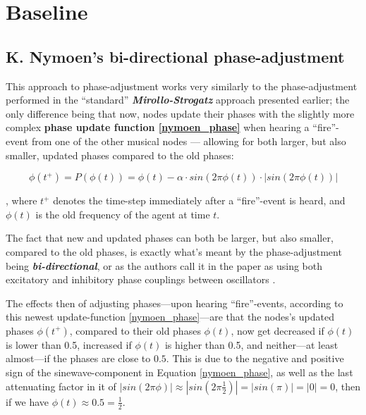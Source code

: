 \chapter{Baseline}
\label{chap:baseline}
	
\section{K. Nymoen's bi-directional phase-adjustment} %
\label{nymoen_phase_adjust}

This approach to phase-adjustment works very similarly to the phase-adjustment performed in the ``standard'' \textbf{\textit{Mirollo-Strogatz}} approach presented earlier; the only difference being that now, nodes update their phases with the slightly more complex \textbf{phase update function \eqref{nymoen_phase}} when hearing a ``fire''-event from one of the other musical nodes — allowing for both larger, but also smaller, updated phases compared to the old phases:

\begin{equation}
\label{nymoen_phase}
	\phi(t^+)=P(\phi(t)) = \phi(t) - \alpha \cdot sin(2\pi\phi(t)) \cdot | sin(2\pi\phi(t)) |
\end{equation}

, where $t^+$ denotes the time-step immediately after a ``fire''-event is heard, and $\phi(t)$ is the old frequency of the agent at time $t$.

The fact that new and updated phases can both be larger, but also smaller, compared to the old phases, is exactly what's meant by the phase-adjustment being \textbf{\textit{bi-directional}}, or as the authors call it in the paper as using both excitatory and inhibitory phase couplings between oscillators \cite{nymoen_synch}.

The effects then of adjusting phases—upon hearing ``fire''-events, according to this newest update-function \eqref{nymoen_phase}—are that the nodes's updated phases $\phi(t^+)$, compared to their old phases $\phi(t)$, now get decreased if $\phi(t)$ is lower than 0.5, increased if $\phi(t)$ is higher than 0.5, and neither—at least almost—if the phases are close to $0.5$. This is due to the negative and positive sign of the sinewave-component in Equation \eqref{nymoen_phase}, as well as the last attenuating factor in it of $| sin(2\pi\phi) | \approx | sin(2\pi \frac{1}{2}) | = | sin(\pi) | = | 0 | = 0$, then if we have $\phi(t) \approx 0.5 = \frac{1}{2}$.

















